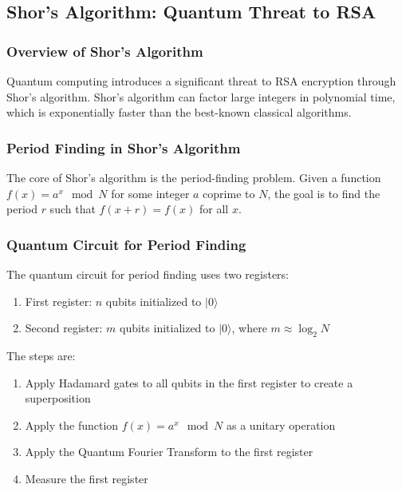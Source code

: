 \documentclass{article}
\begin{document}
\subsection{Shor's Algorithm: Quantum Threat to RSA}

\subsubsection{Overview of Shor's Algorithm}
Quantum computing introduces a significant threat to RSA encryption through Shor's algorithm. Shor's algorithm can factor large integers in polynomial time, which is exponentially faster than the best-known classical algorithms.

\subsubsection{Period Finding in Shor's Algorithm}
The core of Shor's algorithm is the period-finding problem. Given a function $f(x) = a^x \mod N$ for some integer $a$ coprime to $N$, the goal is to find the period $r$ such that $f(x + r) = f(x)$ for all $x$.

\subsubsection{Quantum Circuit for Period Finding}
The quantum circuit for period finding uses two registers:
\begin{enumerate}
    \item First register: $n$ qubits initialized to $|0\rangle$
    \item Second register: $m$ qubits initialized to $|0\rangle$, where $m \approx \log_2 N$
\end{enumerate}

The steps are:
\begin{enumerate}
    \item Apply Hadamard gates to all qubits in the first register to create a superposition
    \item Apply the function $f(x) = a^x \mod N$ as a unitary operation
    \item Apply the Quantum Fourier Transform to the first register
    \item Measure the first register
\end{enumerate}
\end{document}
